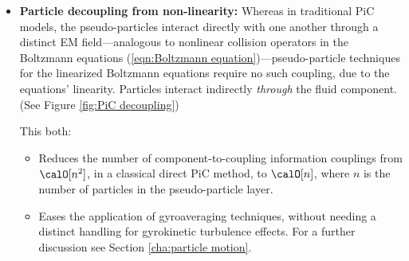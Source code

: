     \begin{itemize}
        \item  {\bf Particle decoupling from non-linearity:} Whereas in traditional PiC models, the pseudo-particles interact directly with one another through a distinct EM field---analogous to nonlinear collision operators in the Boltzmann equations (\ref{eqn:Boltzmann equation})---pseudo-particle techniques for the linearized Boltzmann equations require no such coupling, due to the equations' linearity. Particles interact indirectly \emph{through} the fluid component. (See Figure \ref{fig:PiC decoupling})

        This both:
        \begin{itemize}
            \item  Reduces the number of component-to-coupling information couplings from $\calO[n^{2}]$, in a classical direct PiC method, to $\calO[n]$, where $n$ is the number of particles in the pseudo-particle layer.
            \item  Eases the application of gyroaveraging techniques, without needing a distinct handling for gyrokinetic turbulence effects. For a further discussion see Section \ref{cha:particle motion}.
        \end{itemize}

        
        \begin{figure}[!ht]
            \centering
            \begin{subfigure}{0.5\textwidth}
                \centering
\end{subfigure}
\end{figure}
\end{itemize}

